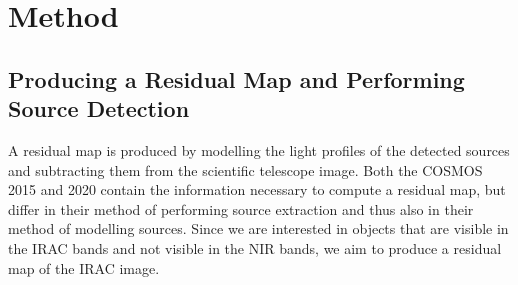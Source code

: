 \section{Method}
\subsection{Producing a Residual Map and Performing Source Detection}
A residual map is produced by modelling the light profiles of the detected sources and subtracting them from the scientific telescope image. Both the COSMOS 2015 and 2020 contain the information necessary to compute a residual map, but differ in their method of performing source extraction and thus also in their method of modelling sources. Since we are interested in objects that are visible in the IRAC bands and not visible in the NIR bands, we aim to produce a residual map of the IRAC image. \\

